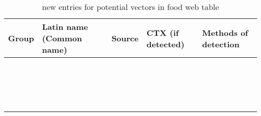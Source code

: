 \documentclass[12pt]{article}
\begin{document}
\begin{table}
\caption{new entries for potential vectors in food web table}
\begin{tabular}{ | p{2cm} | p{3cm} | p{4.5cm} | p{2cm} | p{3cm} | }
\hline
\textbf{Group} & \textbf{Latin name} (Common name) & \textbf{Source} & \textbf{CTX (if detected)} & \textbf{Methods of detection} \\
\hline
  &  \emph{} &  &  & \\
  & \emph{}  &  &  & \\
  & \emph{} &  &  & \\
  &  \emph{} &  &  & \\
  & \emph{}  &  &  & \\
  & \emph{} &  &  & \\
  &  \emph{} &  &  & \\
  & \emph{}  &  &  & \\
  & \emph{} &  &  & \\
  &  \emph{} &  &  & \\
  & \emph{}  &  &  & \\
  & \emph{} &  &  & \\
  &  \emph{} &  &  & \\
  & \emph{}  &  &  & \\
  & \emph{} &  &  & \\
  &  \emph{} &  &  & \\
  & \emph{}  &  &  & \\
  & \emph{} &  &  & \\
\end{tabular}
\end{table}
\end{document}
